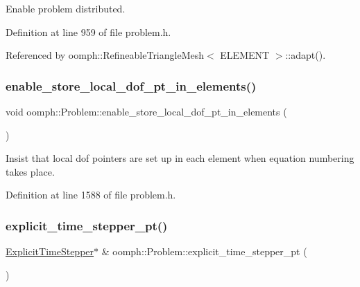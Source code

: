 Enable problem distributed. 



Definition at line 959 of file problem.\+h.



Referenced by oomph\+::\+Refineable\+Triangle\+Mesh$<$ E\+L\+E\+M\+E\+N\+T $>$\+::adapt().

\mbox{\label{classoomph_1_1Problem_a31ba79405993ec52e3017d6ff3a42c8c}} 
\subsubsection{\texorpdfstring{enable\+\_\+store\+\_\+local\+\_\+dof\+\_\+pt\+\_\+in\+\_\+elements()}{enable\_store\_local\_dof\_pt\_in\_elements()}}
{\footnotesize\ttfamily void oomph\+::\+Problem\+::enable\+\_\+store\+\_\+local\+\_\+dof\+\_\+pt\+\_\+in\+\_\+elements (\begin{DoxyParamCaption}{ }\end{DoxyParamCaption})\hspace{0.3cm}{\ttfamily [inline]}}



Insist that local dof pointers are set up in each element when equation numbering takes place. 



Definition at line 1588 of file problem.\+h.

\mbox{\label{classoomph_1_1Problem_a6e1f71717b7541246f8bea79dc5ba943}} 
\subsubsection{\texorpdfstring{explicit\+\_\+time\+\_\+stepper\+\_\+pt()}{explicit\_time\_stepper\_pt()}}
{\footnotesize\ttfamily \hyperlink{classoomph_1_1ExplicitTimeStepper}{Explicit\+Time\+Stepper}$\ast$ \& oomph\+::\+Problem\+::explicit\+\_\+time\+\_\+stepper\+\_\+pt (\begin{DoxyParamCaption}{ }\end{DoxyParamCaption})\hspace{0.3cm}{\ttfamily [inline]}}



